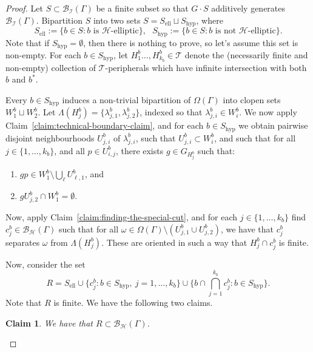 \documentclass[11pt,a4paper]{amsart}
\newtheorem{claim}[theorem]{Claim}
\theoremstyle{definition}
\newcommand{\per}{\mathcal{H}}
\newcommand{\br}{{\mathscr{B}}}
\begin{document}
    \begin{proof}
        Let $S \subset \br_{\mathcal I}(\Gamma)$ be a finite subset so that $G \cdot S$ additively generates $\br_{\mathcal I}(\Gamma)$.  Bipartition $S$ into two sets $S = S_{\mathrm{ell}} \sqcup S _{\mathrm{hyp}}$, where
        $$
        S_{\mathrm{ell}} := \{b \in S : \text{$b$ is $\per$-elliptic}\}, \ \ \ S_{\mathrm{hyp}} := \{b \in S : \text{$b$ is not $\per$-elliptic}\}.
        $$
        Note that if $S_{\mathrm{hyp}} = \emptyset$, then there is nothing to prove, so let's assume this set is non-empty. For each $b \in S_{\mathrm{hyp}}$, let $H_1^{b} \ldots, H_{k_b}^b \in \mathcal T$ denote the (necessarily finite and non-empty) collection of $\mathcal T$-peripherals which have infinite intersection with both $b$ and $b^\ast$. 

        Every $b \in S_{\mathrm{hyp}}$ induces a non-trivial bipartition of $\Omega(\Gamma)$ into clopen sets $W_1^b \sqcup W_2^b$. Let $\Lambda(H_j^b) = \{\lambda_{j,1}^b, \lambda_{j,2}^b\}$, indexed so that $\lambda^b_{j,i} \in W_i^b$. 
        We now apply Claim~\ref{claim:technical-boundary-claim}, and for each $b \in S_{\mathrm{hyp}}$ we obtain pairwise disjoint neighbourhoods $U_{j,i}^b$ of $\lambda_{j,i}^b$, such that $U_{j,i}^b \subset W_i^b$, and such that for all $j \in \{1,\ldots, k_b\}$, and all $p \in U_{i,j}^b$, there exists $g \in G_{H_j^b}$ such that:
            \begin{enumerate}
                \item $gp \in W_1^b \setminus \bigcup _\ell U_{\ell,1}^b$, and

                \item $gU_{j,2}^b \cap W_1^b = \emptyset$.
            \end{enumerate}
        Now, apply Claim~\ref{claim:finding-the-special-cut}, and for each $j \in \{1, \ldots, k_b\}$ find $c^b_j \in \br_\per(\Gamma)$ such that for all $\omega \in \Omega(\Gamma) \setminus (U_{j,1}^b \cup U_{j,2}^b)$, we have that $c_j^b$ separates $\omega$ from $\Lambda(H_j^b)$. These are oriented in such a way that $H_j^b \cap c_j^b$ is finite. 

        Now, consider the set 
        $$
        R = S_{\mathrm{ell}} \cup \Big\{c_j^b : b \in S_{\mathrm{hyp}}, \ j = 1, \ldots, k_b  \Big\} \cup \Bigg\{ b \cap \bigcap_{j=1}^{k_b} c_j^b : b \in S_{\mathrm{hyp}}  \Bigg\}. 
        $$
        Note that $R$ is finite. We have the following two claims.

        \begin{claim}
            We have that $R \subset \br_\per(\Gamma)$.
        \end{claim}


\end{proof}
\end{document}
